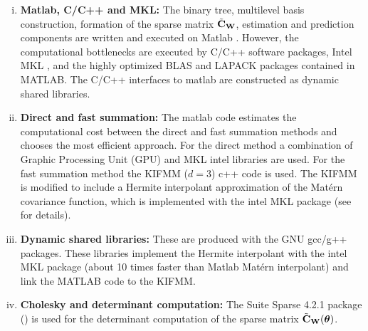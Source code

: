 \documentclass[11pt,final]{amsart}       %
\begin{document}
\begin{enumerate}[i)]

\item {\bf Matlab, C/C++ and MKL:} The binary tree, multilevel basis
  construction, formation of the sparse matrix $\tilde {\mathbf{C}}_{\mathbf{W}}$,
  estimation and prediction components are written and executed on
  Matlab \cite{Matlab2016}. However, the computational bottlenecks are
  executed by C/C++ software packages, Intel MKL \cite{intelmkl}, and
  the highly optimized BLAS and LAPACK packages contained in
  MATLAB. The C/C++ interfaces to matlab are constructed as dynamic
  shared libraries.

  

\item {\bf Direct and fast summation:} The matlab code estimates the
  computational cost between the direct and fast summation methods and
  chooses the most efficient approach.  For the direct method a
  combination of Graphic Processing Unit (GPU) and MKL intel libraries
  are used. For the fast summation method the KIFMM ($d = 3$) c++ code
  is used.  The KIFMM is modified to include a Hermite interpolant
  approximation of the Mat\'{e}rn covariance function, which is
  implemented with the intel MKL package \cite{intelmkl} (see
  \cite{Castrillon2015} for details).


\item {\bf Dynamic shared libraries:} These are produced with the GNU
  gcc/g++ packages. These libraries implement the Hermite interpolant
  with the intel MKL package (about 10 times faster than Matlab
  Mat\'{e}rn interpolant) and link the MATLAB code to the KIFMM.

\item {\bf Cholesky and determinant computation:} The Suite Sparse
  4.2.1 package
  (\cite{Chen2008,Davis2009,Davis2005,Davis2001,Davis1999}) is used
  for the determinant computation of the sparse matrix $\tilde
  {\mathbf{C}}_{\mathbf{W}}(\boldsymbol{\theta})$.

\end{enumerate}
\end{document}
